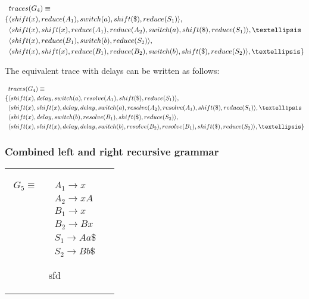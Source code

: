 \documentclass[11pt]{article}
\begin{document}
\parbox{.3\textwidth}{\begin{align*}
&traces(G_4) \equiv \\
\{ & \langle shift(x), reduce(A_1), switch(a), shift(\$), reduce(S_1) \rangle,\\
   & \langle shift(x), shift(x), reduce(A_1), reduce(A_2), switch(a), shift(\$), reduce(S_1) \rangle, \textellipsis \\
   & \langle shift(x), reduce(B_1), switch(b), reduce(S_2) \rangle,\\
   & \langle shift(x), shift(x), reduce(B_1), reduce(B_2), switch(b), shift(\$), reduce(S_2) \rangle, \textellipsis \}
\end{align*}}

The equivalent trace with delays can be written as follows:

\parbox{.3\textwidth}{\begin{align*}
&traces(G_4) \equiv \\
\{ & \langle shift(x), delay, switch(a), resolve(A_1), shift(\$), reduce(S_1) \rangle,\\
   & \langle shift(x), shift(x), delay, delay, switch(a), resolve(A_2), resolve(A_1), shift(\$), reduce(S_1) \rangle, \textellipsis \\
   & \langle shift(x), delay, switch(b), resolve(B_1), shift(\$), reduce(S_2) \rangle,\\
   & \langle shift(x), shift(x), delay, delay, switch(b), resolve(B_2), resolve(B_1), shift(\$), reduce(S_2) \rangle, \textellipsis \}
\end{align*}}

\subsubsection{Combined left and right recursive grammar}
\begin{tabular}[t]{cl}
\parbox{.3\textwidth}{
\begin{align*}
G_5 \equiv \quad & A_1 \rightarrow x\\
                 & A_2 \rightarrow x A\\
                 & B_1 \rightarrow x\\
                 & B_2 \rightarrow B x\\
                 & S_1 \rightarrow A a \$\\
                 & S_2 \rightarrow B b \$
\end{align*}}
\parbox{.8\textwidth}{sfd}
\end{tabular}
\end{document}
